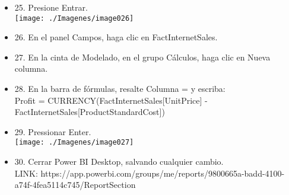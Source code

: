 \begin{itemize}
\item 25. Presione Entrar.\\
\texttt{[image: ./Imagenes/image026]}
\item 26. En el panel Campos, haga clic en FactInternetSales.
\item 27. En la cinta de Modelado, en el grupo Cálculos, haga clic en Nueva columna.
\item 28. En la barra de fórmulas, resalte Columna = y escriba:\\
Profit = CURRENCY(FactInternetSales[UnitPrice] - \\
FactInternetSales[ProductStandardCost])\\
\item 29. Pressionar Enter.\\
\texttt{[image: ./Imagenes/image027]}
\item 30. Cerrar Power BI Desktop, salvando cualquier cambio. \\
LINK: https://app.powerbi.com/groups/me/reports/9800665a-badd-4100-a74f-4fea5114c745/ReportSection

\end{itemize}